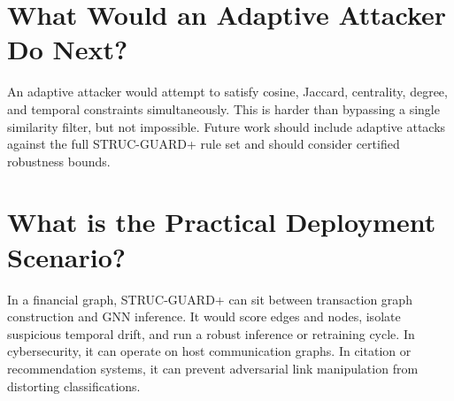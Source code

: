\documentclass[12pt,oneside]{report}
\begin{document}
\section{What Would an Adaptive Attacker Do Next?}
An adaptive attacker would attempt to satisfy cosine, Jaccard, centrality, degree, and temporal constraints simultaneously. This is harder than bypassing a single similarity filter, but not impossible. Future work should include adaptive attacks against the full STRUC-GUARD+ rule set and should consider certified robustness bounds.

\section{What is the Practical Deployment Scenario?}
In a financial graph, STRUC-GUARD+ can sit between transaction graph construction and GNN inference. It would score edges and nodes, isolate suspicious temporal drift, and run a robust inference or retraining cycle. In cybersecurity, it can operate on host communication graphs. In citation or recommendation systems, it can prevent adversarial link manipulation from distorting classifications.
\end{document}

